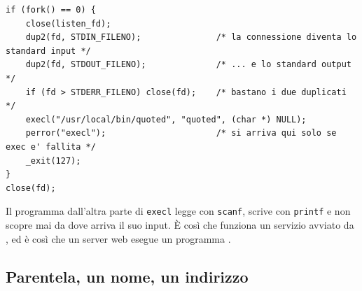 \begin{lstlisting}[language={[POSIX]C}, style=wnumbers, title={Un programma che non sa di essere in rete}]
if (fork() == 0) {
    close(listen_fd);
    dup2(fd, STDIN_FILENO);               /* la connessione diventa lo standard input */
    dup2(fd, STDOUT_FILENO);              /* ... e lo standard output */
    if (fd > STDERR_FILENO) close(fd);    /* bastano i due duplicati */
    execl("/usr/local/bin/quoted", "quoted", (char *) NULL);
    perror("execl");                      /* si arriva qui solo se exec e' fallita */
    _exit(127);
}
close(fd);
\end{lstlisting}

Il programma dall'altra parte di \texttt{execl} legge con \texttt{scanf}, scrive con \texttt{printf} e non scopre mai da
dove arriva il suo input. È così che funziona un servizio avviato da , ed è così che un server web esegue un
programma .


\subsection{Parentela, un nome, un indirizzo}

